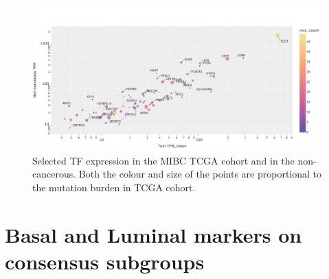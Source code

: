 \begin{figure}[!htb]
    \centering
    \includegraphics[width=1.0\textwidth,keepaspectratio]{Sections/Network_I/Resources/selective_pruning/sel_tfs/sel_tfs_mean_tum_healthy.png}
    \caption[Tumour vs non-tumour gene expression of the 98 TF]{Selected TF expression in the MIBC TCGA cohort and in the non-cancerous. Both the colour and size of the points are proportional to the mutation burden in TCGA cohort.}
    \label{fig:ap:sel_tfs_mean}
\end{figure}


\section{Basal and Luminal markers on consensus subgroups} \label{s:ap:sel_prun_markers}

